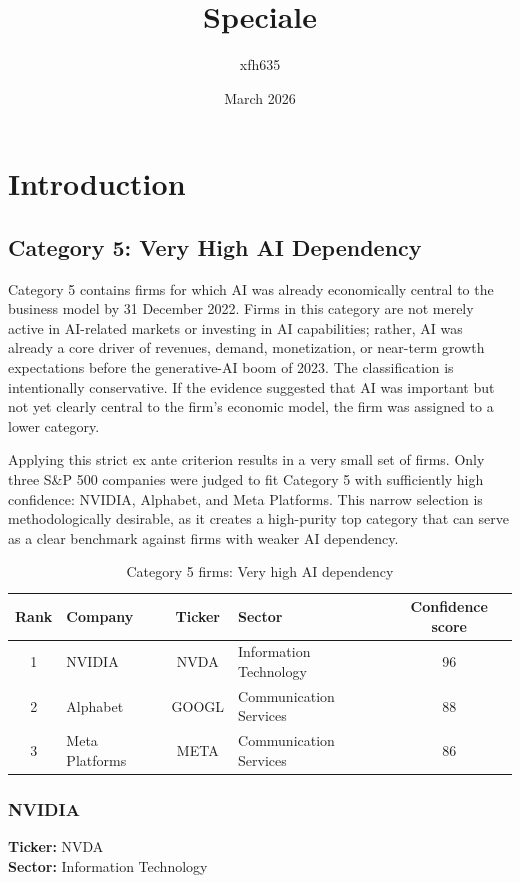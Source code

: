 \documentclass{article}
\title{Speciale}
\author{xfh635 }
\date{March 2026}
\begin{document}
\maketitle

\section{Introduction}



\subsection{Category 5: Very High AI Dependency}

Category 5 contains firms for which AI was already economically central to the business model by 31 December 2022. Firms in this category are not merely active in AI-related markets or investing in AI capabilities; rather, AI was already a core driver of revenues, demand, monetization, or near-term growth expectations before the generative-AI boom of 2023. The classification is intentionally conservative. If the evidence suggested that AI was important but not yet clearly central to the firm’s economic model, the firm was assigned to a lower category.

Applying this strict ex ante criterion results in a very small set of firms. Only three S\&P 500 companies were judged to fit Category 5 with sufficiently high confidence: NVIDIA, Alphabet, and Meta Platforms. This narrow selection is methodologically desirable, as it creates a high-purity top category that can serve as a clear benchmark against firms with weaker AI dependency.

\begin{table}[H]
\centering
\caption{Category 5 firms: Very high AI dependency}
\begin{tabular}{|c|l|c|l|c|}
\hline
\textbf{Rank} & \textbf{Company} & \textbf{Ticker} & \textbf{Sector} & \textbf{Confidence score} \\ \hline
1 & NVIDIA & NVDA & Information Technology & 96 \\ \hline
2 & Alphabet & GOOGL & Communication Services & 88 \\ \hline
3 & Meta Platforms & META & Communication Services & 86 \\ \hline
\end{tabular}
\label{tab:category5}
\end{table}

\subsubsection*{NVIDIA}
\textbf{Ticker:} NVDA \\
\textbf{Sector:} Information Technology
\end{document}
